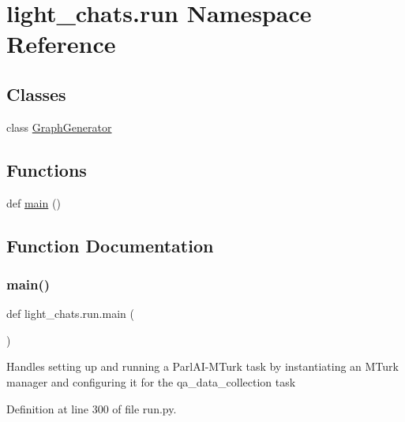 \hypertarget{namespacelight__chats_1_1run}{}\section{light\+\_\+chats.\+run Namespace Reference}
\label{namespacelight__chats_1_1run}
\subsection*{Classes}
\begin{DoxyCompactItemize}
\item 
class \hyperlink{classlight__chats_1_1run_1_1GraphGenerator}{Graph\+Generator}
\end{DoxyCompactItemize}
\subsection*{Functions}
\begin{DoxyCompactItemize}
\item 
def \hyperlink{namespacelight__chats_1_1run_a1966c0bed443d10aceaa1729e5f1950c}{main} ()
\end{DoxyCompactItemize}


\subsection{Function Documentation}
\mbox{\label{namespacelight__chats_1_1run_a1966c0bed443d10aceaa1729e5f1950c}} 
\subsubsection{\texorpdfstring{main()}{main()}}
{\footnotesize\ttfamily def light\+\_\+chats.\+run.\+main (\begin{DoxyParamCaption}{ }\end{DoxyParamCaption})}

\begin{DoxyVerb}Handles setting up and running a ParlAI-MTurk task by instantiating
an MTurk manager and configuring it for the qa_data_collection task
\end{DoxyVerb}
 

Definition at line 300 of file run.\+py.

